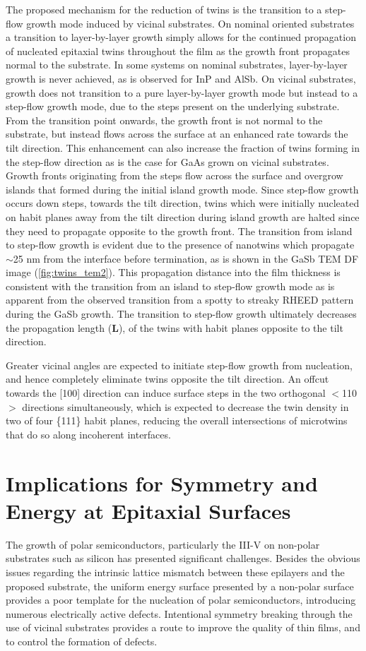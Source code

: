 The proposed mechanism for the reduction of twins is the transition to a step-flow growth mode induced by vicinal substrates. On nominal oriented substrates a transition to layer-by-layer growth simply allows for the continued propagation of nucleated epitaxial twins throughout the film as the growth front propagates normal to the substrate. In some systems on nominal substrates, layer-by-layer growth is never achieved, as is observed for InP and AlSb. On vicinal substrates, growth does not transition to a pure layer-by-layer growth mode but instead to a step-flow growth mode, due to the steps present on the underlying substrate. From the transition point onwards, the growth front is not normal to the substrate, but instead flows across the surface at an enhanced rate towards the tilt direction. This enhancement can also increase the fraction of twins forming in the step-flow direction as is the case for GaAs grown on vicinal substrates. Growth fronts originating from the steps flow across the surface and overgrow islands that formed during the initial island growth mode. Since step-flow growth occurs down steps, towards the tilt direction, twins which were initially nucleated on habit planes away from the tilt direction during island growth are halted since they need to propagate opposite to the growth front. The transition from island to step-flow growth is evident due to the presence of nanotwins which propagate $\sim$25 nm from the interface before termination, as is shown in the GaSb TEM DF image (\cref{fig:twins_tem2}). This propagation distance into the film thickness is consistent with the transition from an island to step-flow growth mode as is apparent from the observed transition from a spotty to streaky RHEED pattern during the GaSb growth. The transition to step-flow growth ultimately decreases the propagation length (\textbf{L}), of the twins with habit planes opposite to the tilt direction. 

Greater vicinal angles are expected to initiate step-flow growth from nucleation, and hence completely eliminate twins opposite the tilt direction. An offcut towards the [100] direction can induce surface steps in the two orthogonal $<$110$>$ directions simultaneously\cite{Fang1990}, which is expected to decrease the twin density in two of four \{111\} habit planes, reducing the overall intersections of microtwins that do so along incoherent interfaces.
\section{Implications for Symmetry and Energy at Epitaxial Surfaces}
The growth of polar semiconductors, particularly the III-V on non-polar substrates such as silicon has presented significant challenges. Besides the obvious issues regarding the intrinsic lattice mismatch between these epilayers and the proposed substrate, the uniform energy surface presented by a non-polar surface provides a poor template for the nucleation of polar semiconductors, introducing numerous electrically active defects. Intentional symmetry breaking through the use of vicinal substrates provides a route to improve the quality of thin films, and to control the formation of defects.

